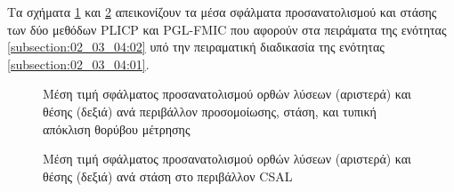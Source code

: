Τα σχήματα \ref{fig:appendix:03_04:sim_orientation_position_errors}
και \ref{fig:appendix:03_04:csal_orientation_position_errors} απεικονίζουν
τα μέσα σφάλματα προσανατολισμού και στάσης των δύο μεθόδων PLICP και PGL-FMIC
που αφορούν στα πειράματα της ενότητας \ref{subsection:02_03_04:02} υπό
την πειραματική διαδικασία της ενότητας \ref{subsection:02_03_04:01}.

\begin{figure}
  \begin{subfigure}{0.5\linewidth}
    
  \end{subfigure}\hspace{1.0cm}
  \begin{subfigure}{0.5\linewidth}
    
  \end{subfigure}
  \vspace{-2.5cm}
\caption{\small Μέση τιμή σφάλματος προσανατολισμού ορθών λύσεων (αριστερά) και
         θέσης (δεξιά) ανά περιβάλλον προσομοίωσης, στάση, και τυπική απόκλιση
         θορύβου μέτρησης}
\label{fig:appendix:03_04:sim_orientation_position_errors}
\end{figure}

\begin{figure}[]
  \begin{subfigure}{0.5\linewidth}
    
  \end{subfigure}\hspace{1.0cm}
  \begin{subfigure}{0.5\linewidth}
    
  \end{subfigure}
  \vspace{1cm}
\caption{\small Μέση τιμή σφάλματος προσανατολισμού ορθών λύσεων (αριστερά) και
         θέσης (δεξιά) ανά στάση στο περιβάλλον CSAL}
\label{fig:appendix:03_04:csal_orientation_position_errors}
\end{figure}
